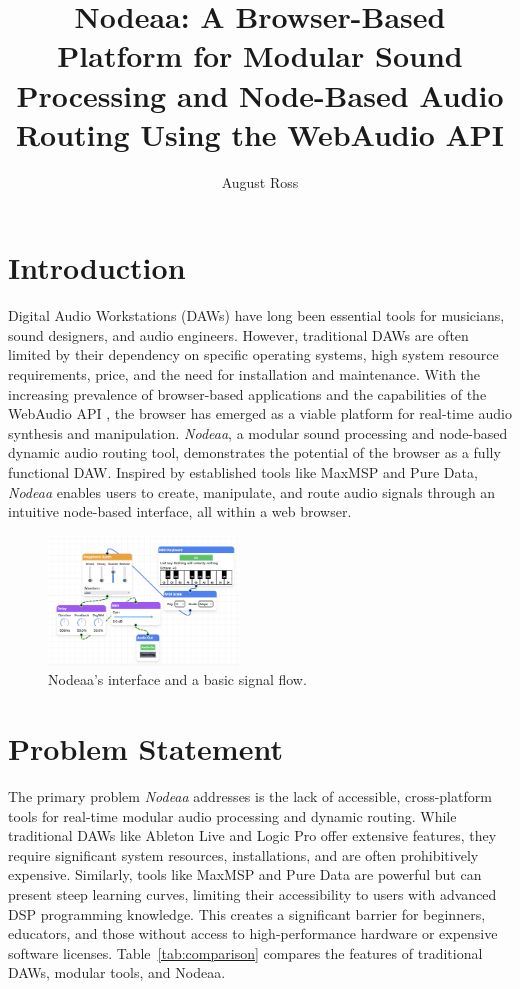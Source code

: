 \documentclass[10pt,twocolumn]{article}
\title{Nodeaa: A Browser-Based Platform for Modular Sound Processing and Node-Based Audio Routing Using the WebAudio API}
\author{August Ross}
\affiliation{Occidental College}
\begin{document}
\maketitle

\section{Introduction}

Digital Audio Workstations (DAWs) have long been essential tools for musicians, sound designers, and audio engineers. However, traditional DAWs are often limited by their dependency on specific operating systems, high system resource requirements, price, and the need for installation and maintenance. With the increasing prevalence of browser-based applications and the capabilities of the WebAudio API \cite{smus2013web}, the browser has emerged as a viable platform for real-time audio synthesis and manipulation. \textit{Nodeaa}, a modular sound processing and node-based dynamic audio routing tool, demonstrates the potential of the browser as a fully functional DAW. Inspired by established tools like MaxMSP and Pure Data, \textit{Nodeaa} enables users to create, manipulate, and route audio signals through an intuitive node-based interface, all within a web browser.

\begin{figure}[ht]
    \centering
    \includegraphics[width=0.45\textwidth]{images/nodeaa.png}
    \caption{Nodeaa's interface and a basic signal flow.}
    \label{fig:nodeaa}
\end{figure}

\section{Problem Statement}

The primary problem \textit{Nodeaa} addresses is the lack of accessible, cross-platform tools for real-time modular audio processing and dynamic routing. While traditional DAWs like Ableton Live and Logic Pro offer extensive features, they require significant system resources, installations, and are often prohibitively expensive. Similarly, tools like MaxMSP and Pure Data are powerful but can present steep learning curves, limiting their accessibility to users with advanced DSP programming knowledge. This creates a significant barrier for beginners, educators, and those without access to high-performance hardware or expensive software licenses. Table~\ref{tab:comparison} compares the features of traditional DAWs, modular tools, and Nodeaa.
\end{document}
